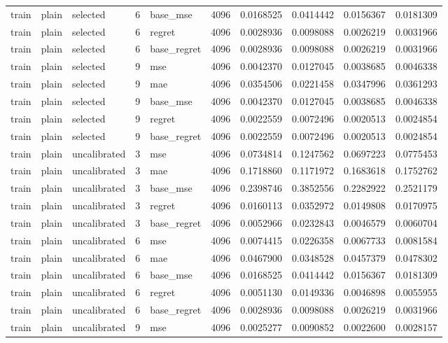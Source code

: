 \begin{tabular}{lllrlrrrrr}
train & plain & selected & 6 & base_mse & 4096 & 0.0168525 & 0.0414442 & 0.0156367 & 0.0181309 \\
train & plain & selected & 6 & regret & 4096 & 0.0028936 & 0.0098088 & 0.0026219 & 0.0031966 \\
train & plain & selected & 6 & base_regret & 4096 & 0.0028936 & 0.0098088 & 0.0026219 & 0.0031966 \\
train & plain & selected & 9 & mse & 4096 & 0.0042370 & 0.0127045 & 0.0038685 & 0.0046338 \\
train & plain & selected & 9 & mae & 4096 & 0.0354506 & 0.0221458 & 0.0347996 & 0.0361293 \\
train & plain & selected & 9 & base_mse & 4096 & 0.0042370 & 0.0127045 & 0.0038685 & 0.0046338 \\
train & plain & selected & 9 & regret & 4096 & 0.0022559 & 0.0072496 & 0.0020513 & 0.0024854 \\
train & plain & selected & 9 & base_regret & 4096 & 0.0022559 & 0.0072496 & 0.0020513 & 0.0024854 \\
train & plain & uncalibrated & 3 & mse & 4096 & 0.0734814 & 0.1247562 & 0.0697223 & 0.0775453 \\
train & plain & uncalibrated & 3 & mae & 4096 & 0.1718860 & 0.1171972 & 0.1683618 & 0.1752762 \\
train & plain & uncalibrated & 3 & base_mse & 4096 & 0.2398746 & 0.3852556 & 0.2282922 & 0.2521179 \\
train & plain & uncalibrated & 3 & regret & 4096 & 0.0160113 & 0.0352972 & 0.0149808 & 0.0170975 \\
train & plain & uncalibrated & 3 & base_regret & 4096 & 0.0052966 & 0.0232843 & 0.0046579 & 0.0060704 \\
train & plain & uncalibrated & 6 & mse & 4096 & 0.0074415 & 0.0226358 & 0.0067733 & 0.0081584 \\
train & plain & uncalibrated & 6 & mae & 4096 & 0.0467900 & 0.0348528 & 0.0457379 & 0.0478302 \\
train & plain & uncalibrated & 6 & base_mse & 4096 & 0.0168525 & 0.0414442 & 0.0156367 & 0.0181309 \\
train & plain & uncalibrated & 6 & regret & 4096 & 0.0051130 & 0.0149336 & 0.0046898 & 0.0055955 \\
train & plain & uncalibrated & 6 & base_regret & 4096 & 0.0028936 & 0.0098088 & 0.0026219 & 0.0031966 \\
train & plain & uncalibrated & 9 & mse & 4096 & 0.0025277 & 0.0090852 & 0.0022600 & 0.0028157 \\

\end{tabular}
